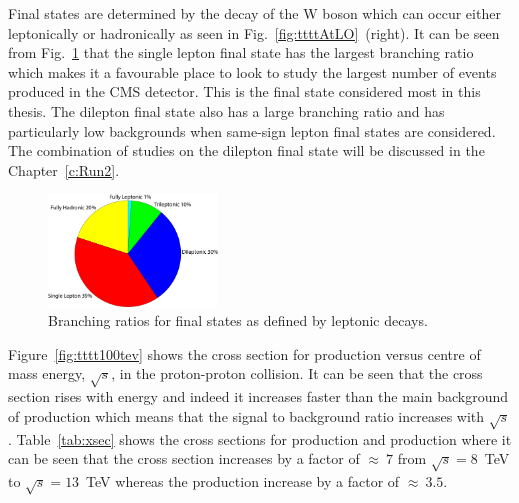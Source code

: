 Final states are determined by the decay of the W boson which can occur either leptonically or hadronically as seen in Fig.~\ref{fig:ttttAtLO}~(right). It can be seen from Fig.~\ref{fig:BRtttt} that the single lepton final state has the largest branching ratio which makes it a favourable place to look to study the largest number of events produced in the CMS detector. This is the final state considered most in this thesis. The dilepton final state also has a large branching ratio and has particularly low backgrounds when same-sign lepton final states are considered. The combination of studies on the dilepton final state will be discussed in the Chapter~\ref{c:Run2}.

\begin{figure}[ht!]
\begin{center}
    \includegraphics[width=0.4\textwidth]{images/Theory/FourTopBR.pdf}
    \caption{Branching ratios for final states as defined by leptonic decays.}
    \label{fig:BRtttt}
\end{center}
\end{figure}

Figure~\ref{fig:tttt100tev} shows the cross section for \tttt production versus centre of mass energy, $\sqrt{s}$, in the proton-proton collision. It can be seen that the cross section rises with energy and indeed it increases faster than the main background of \ttbar production which means that the signal to background ratio increases with $\sqrt{s}$. Table~\ref{tab:xsec} shows the cross sections for \tttt production and \ttbar production where it can be seen that the \tttt cross section increases by a factor of $\approx~7$ from $\sqrt{s} = 8$~TeV to $\sqrt{s} = 13$~TeV whereas the \ttbar production increase by a factor of $\approx~3.5$.


